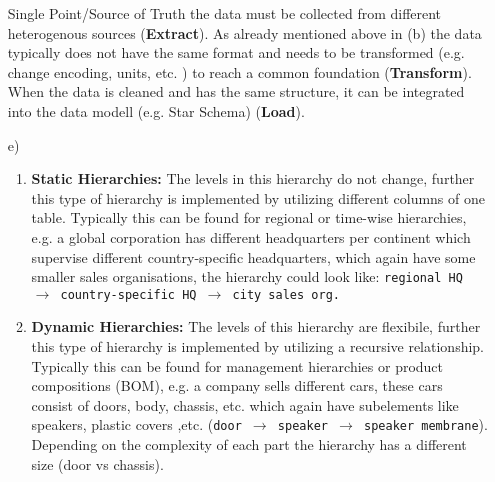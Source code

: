 \documentclass{scrartcl}
\begin{document}
\begin{itemize}
		\glqq{}Single Point/Source of Truth\grqq{} the data must be collected from different heterogenous sources
		(\textbf{Extract}). As already mentioned above in (b) the data typically does not have the same format and needs to be transformed (e.g. change encoding, units, etc. ) to reach a common foundation (\textbf{Transform}).
		When the data is cleaned and has the same structure, it can be integrated into the data modell (e.g. Star Schema) (\textbf{Load}).
	\item[e)] \mbox{}
	\begin{enumerate}
		\item \textbf{Static Hierarchies:} The levels in this hierarchy do not change, further this type of hierarchy is implemented by utilizing different columns of one table. Typically this can be found for regional or time-wise hierarchies, e.g. a global corporation has different headquarters per continent which supervise different country-specific headquarters, which again have some smaller sales organisations, the hierarchy could look like: \newline{}
		\texttt{regional HQ $\rightarrow$ country-specific HQ $\rightarrow$ city sales org.}
		\item \textbf{Dynamic Hierarchies:} The levels of this hierarchy are flexibile, further this type of hierarchy is implemented by utilizing a recursive relationship.
		Typically this can be found for management hierarchies or product compositions (BOM), e.g. a company sells different cars, these cars consist of doors, body, chassis, etc. which again have subelements like speakers, plastic covers ,etc. (\texttt{door $\rightarrow$ speaker $\rightarrow$ speaker membrane}).
		Depending on the complexity of each part the hierarchy has a different size (door vs chassis).

	\end{enumerate}	
\end{itemize}
\end{document}
